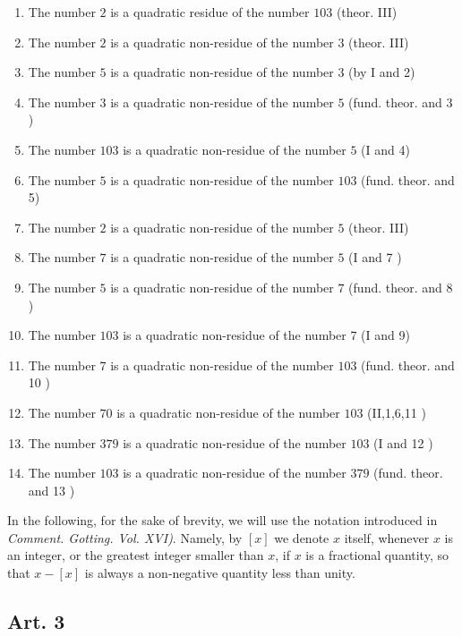 \documentclass{book}
\theoremstyle{plain}
\theoremstyle{remark}
\begin{document}
\begin{enumerate}
\item The number $2$ is a quadratic residue of the number $103$ (theor. III)
\item The number $2$ is a quadratic non-residue of the number $3$ (theor. III)
\item The number $5$ is a quadratic non-residue of the number $3$ (by I and 2)
\item The number $3$ is a quadratic non-residue of the number $5$ (fund. theor. and 3 )
\item The number $103$ is a quadratic non-residue of the number $5$ (I and 4)
\item The number $5$ is a quadratic non-residue of the number $103$ (fund. theor. and 5)
\item The number $2$ is a quadratic non-residue of the number $5$ (theor. III)
\item The number $7$ is a quadratic non-residue of the number $5$ (I and 7 )
\item The number $5$ is a quadratic non-residue of the number $7$ (fund. theor. and 8 )
\item The number $103$ is a quadratic non-residue of the number $7$ (I and 9)
\item The number $7$ is a quadratic non-residue of the number $103$ (fund. theor. and 10 )
\item The number $70$ is a quadratic non-residue of the number $103$ (II,1,6,11 )
\item The number $379$ is a quadratic non-residue of the number $103$ (I and 12 )
\item The number $103$ is a quadratic non-residue of the number $379$ (fund. theor. and 13 )
\end{enumerate}
In the following, for the sake of brevity, we will use the notation introduced in \textit{Comment. Gotting. Vol. XVI)}.  Namely, by $[x]$ we denote $x$ itself, whenever $x$ is an integer, or the greatest integer smaller than $x$, if $x$ is a fractional quantity, so that $x-[x]$ is always a non-negative quantity less than unity.

\subsection*{Art. 3}
\end{document}
